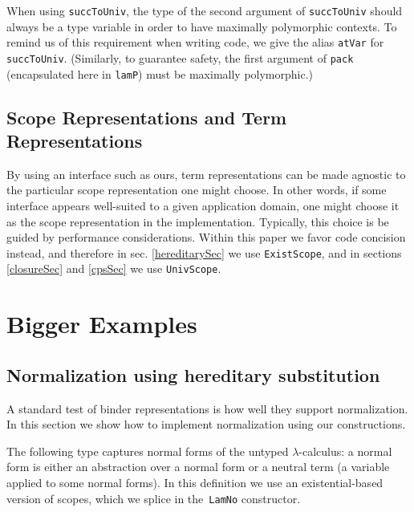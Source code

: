 \documentclass[9pt,preprint,authoryear]{sigplanconf}
\begin{document}
%
%


%
When using \textcolor[rgb]{0,0,0.80}{\texttt{succToUniv}}, the type of the second argument of \textcolor[rgb]{0,0,0.80}{\texttt{succToUniv}}    should always be a type variable in order to have maximally polymorphic contexts.
    To remind us of this requirement when writing code, we give the alias \textcolor[rgb]{0,0,0.80}{\texttt{atVar}} for \textcolor[rgb]{0,0,0.80}{\texttt{succToUniv}}.
    (Similarly, to guarantee safety, the first argument of \textcolor[rgb]{0,0,0.80}{\texttt{pack}} (encapsulated here in \textcolor[rgb]{0,0,0.80}{\texttt{lamP}}) must be maximally polymorphic.)%


\subsection{Scope Representations and Term Representations}

%
By using an interface such as ours, term representations can be made agnostic to the
    particular scope representation one might choose. In other words, if some interface appears
    well-suited to a given application domain, one might choose it as the scope representation
    in the implementation. Typically, this choice is be guided by performance considerations.
    Within this paper we favor code concision instead, and therefore in sec.
    \ref{hereditarySec} we use \textcolor[rgb]{0,0,0.80}{\texttt{ExistScope}}, and in sections
    \ref{closureSec} and \ref{cpsSec} we use \textcolor[rgb]{0,0,0.80}{\texttt{UnivScope}}.


\section{Bigger Examples\label{examples}}

\subsection{Normalization using hereditary substitution\label{hereditarySec}}

%
A standard test of binder representations is how well they support normalization. 
    In this section we show how to implement normalization using our constructions.%


%
The following type
    captures normal forms of the untyped $ \lambda $-calculus{:} a normal form is
    either an abstraction over a normal form or a neutral term (a variable applied to some normal forms). In
    this definition we use an existential-based version of scopes, which
    we splice in the{~}\textcolor[rgb]{0.70,0.13,0.13}{\texttt{LamNo}} constructor.%
\end{document}

